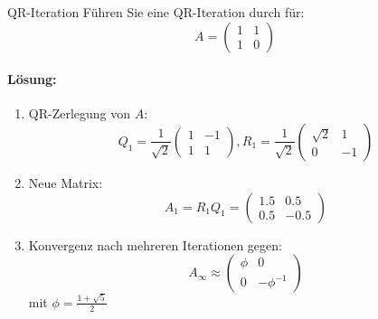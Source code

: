 \begin{example2}{QR-Iteration}
Führen Sie eine QR-Iteration durch für:
$$A = \begin{pmatrix}
1 & 1 \\
1 & 0
\end{pmatrix}$$

\paragraph{Lösung:}
\begin{enumerate}
    \item QR-Zerlegung von $A$:
    $$Q_1 = \frac{1}{\sqrt{2}}\begin{pmatrix}
    1 & -1 \\
    1 & 1
    \end{pmatrix}, 
    R_1 = \frac{1}{\sqrt{2}}\begin{pmatrix}
    \sqrt{2} & 1 \\
    0 & -1
    \end{pmatrix}$$
    
    \item Neue Matrix:
    $$A_1 = R_1Q_1 = \begin{pmatrix}
    1.5 & 0.5 \\
    0.5 & -0.5
    \end{pmatrix}$$
    
    \item Konvergenz nach mehreren Iterationen gegen:
    $$A_\infty \approx \begin{pmatrix}
    \phi & 0 \\
    0 & -\phi^{-1}
    \end{pmatrix}$$
    mit $\phi = \frac{1+\sqrt{5}}{2}$
\end{enumerate}
\end{example2}






